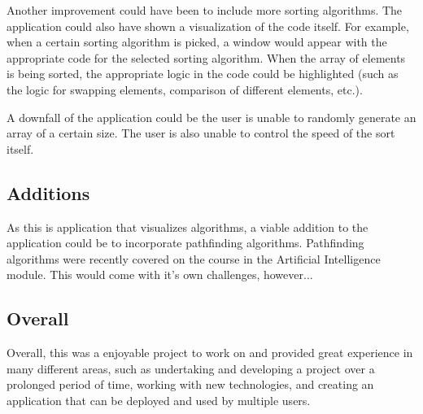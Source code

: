 Another improvement could have been to include more sorting algorithms. The application could also have shown a visualization of the code itself. For example, when a certain sorting algorithm is picked, a window would appear with the appropriate code for the selected sorting algorithm. When the array of elements is being sorted, the appropriate logic in the code could be highlighted (such as the logic for swapping elements, comparison of different elements, etc.).
\bigskip

A downfall of the application could be the user is unable to randomly generate an array of a certain size. The user is also unable to control the speed of the sort itself.

\subsection{Additions}
As this is application that visualizes algorithms, a viable addition to the application could be to incorporate pathfinding algorithms. Pathfinding algorithms were recently covered on the course in the Artificial Intelligence module. This would come with it's own challenges, however...

\subsection{Overall}
Overall, this was a enjoyable project to work on and provided great experience in many different areas, such as undertaking and developing a project over a prolonged period of time, working with new technologies, and creating an application that can be deployed and used by multiple users.